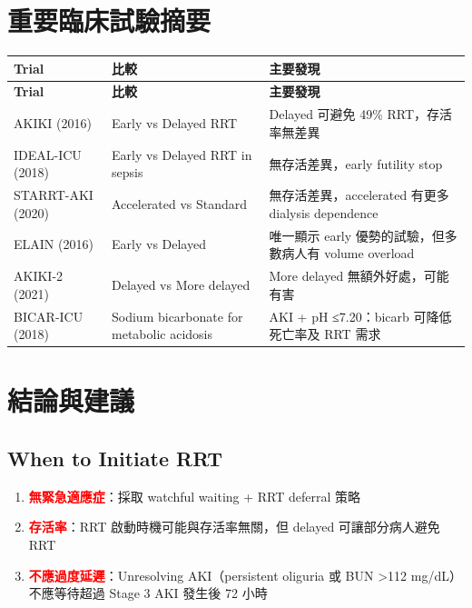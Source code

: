 \documentclass[12pt,a4paper]{article}
\begin{document}
\section{重要臨床試驗摘要}

\begin{longtable}{p{3cm}p{4cm}p{7cm}}
\toprule
\textbf{Trial} & \textbf{比較} & \textbf{主要發現} \\
\midrule
\endfirsthead

\toprule
\textbf{Trial} & \textbf{比較} & \textbf{主要發現} \\
\midrule
\endhead

\bottomrule
\endfoot

AKIKI (2016) & Early vs Delayed RRT & Delayed 可避免 49\% RRT，存活率無差異 \\
\midrule
IDEAL-ICU (2018) & Early vs Delayed RRT in sepsis & 無存活差異，early futility stop \\
\midrule
STARRT-AKI (2020) & Accelerated vs Standard & 無存活差異，accelerated 有更多 dialysis dependence \\
\midrule
ELAIN (2016) & Early vs Delayed & 唯一顯示 early 優勢的試驗，但多數病人有 volume overload \\
\midrule
AKIKI-2 (2021) & Delayed vs More delayed & More delayed 無額外好處，可能有害 \\
\midrule
BICAR-ICU (2018) & Sodium bicarbonate for metabolic acidosis & AKI + pH ≤7.20：bicarb 可降低死亡率及 RRT 需求 \\
\bottomrule
\end{longtable}

\section{結論與建議}

\subsection{When to Initiate RRT}

\begin{enumerate}
    \item \textcolor{red}{\textbf{無緊急適應症}}：採取 watchful waiting + RRT deferral 策略
    \item \textcolor{red}{\textbf{存活率}}：RRT 啟動時機可能與存活率無關，但 delayed 可讓部分病人避免 RRT
    \item \textcolor{red}{\textbf{不應過度延遲}}：Unresolving AKI（persistent oliguria 或 BUN >112 mg/dL）不應等待超過 Stage 3 AKI 發生後 72 小時
\end{enumerate}
\end{document}
